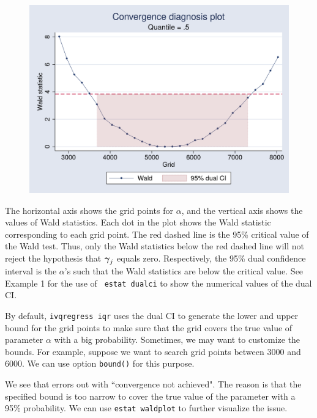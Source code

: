 \begin{stlog}

\end{stlog}

\begin{figure}[H]
\centering
\includegraphics[scale=0.25]{eps/ex4_waldplot1}
\end{figure}

The horizontal axis shows the grid points for $\alpha$, and the vertical axis
shows the values of Wald statistics. Each dot in the plot shows the Wald
statistic corresponding to each grid point. The red dashed line is the 95\%
critical value of the Wald test. Thus, only the Wald statistics below the red
dashed line will not reject the hypothesis that $\boldsymbol{\gamma}_j$ equals zero.
Respectively, the 95\% dual confidence interval is the $\alpha$'s such that the
Wald statistics are below the critical value. See Example 1 for the use of {\tt
estat dualci} to show the numerical values of the dual CI.

By default, {\tt ivqregress iqr} uses the dual CI to generate the lower and
upper bound for the grid points to make sure that the grid covers the true value
of parameter $\alpha$ with a big probability. Sometimes, we may want to
customize the bounds. For example, suppose we want to search grid points between
$3000$ and $6000$. We can use option {\tt bound()} for this purpose.

\begin{stlog}

\end{stlog}

We see that {\ivqreg} errors out with ``convergence not achieved". The reason is
that the specified bound is too narrow to cover the true value of the parameter
with a 95\% probability. We can use {\tt estat waldplot} to further visualize
the issue.

